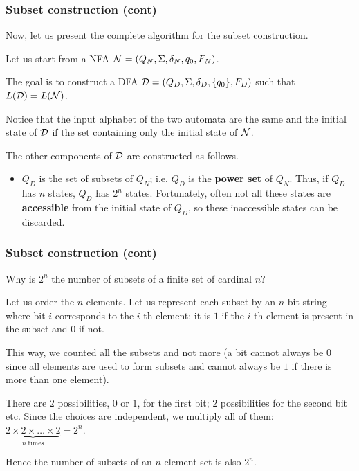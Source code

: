 % 
\begin{frame}
\frametitle{Subset construction (cont)}

Now, let us present the complete algorithm for the subset
construction. 

\bigskip

Let us start from a NFA \({\cal N} = (Q_N, \Sigma, \delta_N, q_0, F_N)\).

\bigskip

The goal is to construct a DFA \({\cal D} = (Q_D, \Sigma, \delta_D,
\{q_0\}, F_D)\) such that \(L({\cal D}) = L({\cal N})\).

\bigskip

Notice that the input alphabet of the two automata are the same and
the initial state of \({\cal D}\) if the set containing only the
initial state of \({\cal N}\).

\bigskip

The other components of \({\cal D}\) are constructed as follows.
\begin{itemize}

  \item \(Q_D\) is the set of subsets of \(Q_N\); i.e. \(Q_D\) is the
  \textbf{power set} of \(Q_N\). Thus, if \(Q_D\) has \(n\) states,
  \(Q_D\) has \(2^n\) states. Fortunately, often not all these states
  are \textbf{accessible} from the initial state of \(Q_D\), so these
  inaccessible states can be discarded.

\end{itemize}

\end{frame}

% 
\begin{frame}
\frametitle{Subset construction (cont)}

\label{state_explosion}

Why is \(2^n\) the number of subsets of a finite set of cardinal
\(n\)?

\bigskip

Let us order the \(n\) elements. Let us represent each subset by an
\(n\)-bit string where bit \(i\) corresponds to the \(i\)-th element:
it is \(1\) if the \(i\)-th element is present in the subset and \(0\)
if not.

\bigskip

This way, we counted all the subsets and not more (a bit cannot always
be \(0\) since all elements are used to form subsets and cannot always
be \(1\) if there is more than one element).

\bigskip

There are \(2\) possibilities, \(0\) or \(1\), for the first bit;
\(2\) possibilities for the second bit etc. Since the choices are
independent, we multiply all of them: \(\underbrace{2 \times 2 \times
  \dots \times 2}_{n \; \text{times}} = 2^n\).

\bigskip

Hence the number of subsets of an \(n\)-element set is also \(2^n\).

\end{frame}

